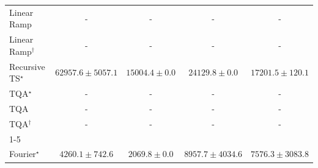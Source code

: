 \begin{tabular}{l|cccc|}
Linear Ramp & {\cellcolor[HTML]{000000}} \color[HTML]{F1F1F1} {\cellcolor{white}} \color{black} - & {\cellcolor[HTML]{000000}} \color[HTML]{F1F1F1} {\cellcolor{white}} \color{black} - & {\cellcolor[HTML]{000000}} \color[HTML]{F1F1F1} {\cellcolor{white}} \color{black} - & {\cellcolor[HTML]{000000}} \color[HTML]{F1F1F1} {\cellcolor{white}} \color{black} - \\
Linear Ramp$^\dagger$ & {\cellcolor[HTML]{000000}} \color[HTML]{F1F1F1} {\cellcolor{white}} \color{black} - & {\cellcolor[HTML]{000000}} \color[HTML]{F1F1F1} {\cellcolor{white}} \color{black} - & {\cellcolor[HTML]{000000}} \color[HTML]{F1F1F1} {\cellcolor{white}} \color{black} - & {\cellcolor[HTML]{000000}} \color[HTML]{F1F1F1} {\cellcolor{white}} \color{black} - \\
Recursive TS$^\star$ & {\cellcolor[HTML]{036B38}} \color[HTML]{F1F1F1} $62957.6\pm 5057.1$ & {\cellcolor[HTML]{FDFED9}} \color[HTML]{000000} $15004.4\pm 0.0$ & {\cellcolor[HTML]{E7F6AD}} \color[HTML]{000000} $24129.8\pm 0.0$ & {\cellcolor[HTML]{FAFDCC}} \color[HTML]{000000} $17201.5\pm 120.1$ \\
TQA$^\star$ & {\cellcolor[HTML]{000000}} \color[HTML]{F1F1F1} {\cellcolor{white}} \color{black} - & {\cellcolor[HTML]{000000}} \color[HTML]{F1F1F1} {\cellcolor{white}} \color{black} - & {\cellcolor[HTML]{000000}} \color[HTML]{F1F1F1} {\cellcolor{white}} \color{black} - & {\cellcolor[HTML]{000000}} \color[HTML]{F1F1F1} {\cellcolor{white}} \color{black} - \\
TQA & {\cellcolor[HTML]{000000}} \color[HTML]{F1F1F1} {\cellcolor{white}} \color{black} - & {\cellcolor[HTML]{000000}} \color[HTML]{F1F1F1} {\cellcolor{white}} \color{black} - & {\cellcolor[HTML]{000000}} \color[HTML]{F1F1F1} {\cellcolor{white}} \color{black} - & {\cellcolor[HTML]{000000}} \color[HTML]{F1F1F1} {\cellcolor{white}} \color{black} - \\
TQA$^\dagger$ & {\cellcolor[HTML]{000000}} \color[HTML]{F1F1F1} {\cellcolor{white}} \color{black} - & {\cellcolor[HTML]{000000}} \color[HTML]{F1F1F1} {\cellcolor{white}} \color{black} - & {\cellcolor[HTML]{000000}} \color[HTML]{F1F1F1} {\cellcolor{white}} \color{black} - & {\cellcolor[HTML]{000000}} \color[HTML]{F1F1F1} {\cellcolor{white}} \color{black} - \\
\cline{1-5}
\multicolumn{5}{c}{\rule{0pt}{8pt}SV} \\
\midrule
Fourier$^\star$ & {\cellcolor[HTML]{A9BFDC}} \color[HTML]{000000} $4260.1\pm 742.6$ & {\cellcolor[HTML]{F5EEF6}} \color[HTML]{000000} $2069.8\pm 0.0$ & {\cellcolor[HTML]{023858}} \color[HTML]{F1F1F1} $8957.7\pm 4034.6$ & {\cellcolor[HTML]{04649E}} \color[HTML]{F1F1F1} $7576.3\pm 3083.8$ \\

\end{tabular}
